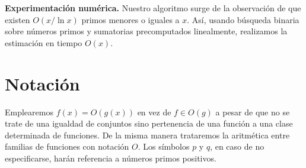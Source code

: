 \noindent
\textbf{Experimentaci\'on num\'erica.}
Nuestro algoritmo surge de la observaci\'on de que
existen \(O(x/\ln x)\) primos menores o iguales a \(x\).
As\'i, usando b\'usqueda binaria sobre
n\'umeros primos y sumatorias precomputados linealmente,
realizamos la estimaci\'on en tiempo \(O(x)\).


\section{Notaci\'on}
Emplearemos \(f(x) = O(g(x))\) en vez de \(f \in O(g)\)
a pesar de que no se trate de una igualdad de conjuntos sino
pertenencia de una funci\'on a una clase determinada de funciones.
De la misma manera trataremos la aritm\'etica entre familias de funciones
con notaci\'on \(O\).
Los s\'imbolos \(p\) y \(q\), en caso de no especificarse,
har\'an referencia a n\'umeros primos positivos.

